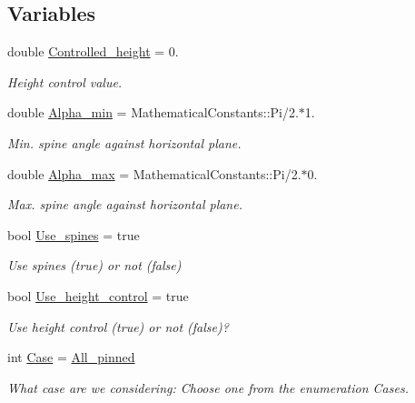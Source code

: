 \subsection*{Variables}
\begin{DoxyCompactItemize}
\item 
double \hyperlink{namespaceGlobalParameters_a3731f24a02ce4f306d65a9a488f85c96}{Controlled\+\_\+height} = 0.
\begin{DoxyCompactList}\small\item\em Height control value. \end{DoxyCompactList}\item 
double \hyperlink{namespaceGlobalParameters_ae8fa7610a34b7a2a8223eade99a5c22f}{Alpha\+\_\+min} = Mathematical\+Constants\+::\+Pi/2.$\ast$1.
\begin{DoxyCompactList}\small\item\em Min. spine angle against horizontal plane. \end{DoxyCompactList}\item 
double \hyperlink{namespaceGlobalParameters_a19d04a02b0b5ef5c72e9c30d822e4dc7}{Alpha\+\_\+max} = Mathematical\+Constants\+::\+Pi/2.$\ast$0.
\begin{DoxyCompactList}\small\item\em Max. spine angle against horizontal plane. \end{DoxyCompactList}\item 
bool \hyperlink{namespaceGlobalParameters_a7cd7766fae9d0ca421d7e24677be3131}{Use\+\_\+spines} = true
\begin{DoxyCompactList}\small\item\em Use spines (true) or not (false) \end{DoxyCompactList}\item 
bool \hyperlink{namespaceGlobalParameters_a624713d35bc418b2d5fa79f4d385a27a}{Use\+\_\+height\+\_\+control} = true
\begin{DoxyCompactList}\small\item\em Use height control (true) or not (false)? \end{DoxyCompactList}\item 
int \hyperlink{namespaceGlobalParameters_aeb4257eec7a4c5a92e2b88e93248a201}{Case} = \hyperlink{namespaceGlobalParameters_adde04e4243b82e3d4bd2f82d37a2d6bfa28147edc9cfc06038f2a7deaf8890558}{All\+\_\+pinned}
\begin{DoxyCompactList}\small\item\em What case are we considering\+: Choose one from the enumeration Cases. \end{DoxyCompactList}\item 

\end{DoxyCompactItemize}
